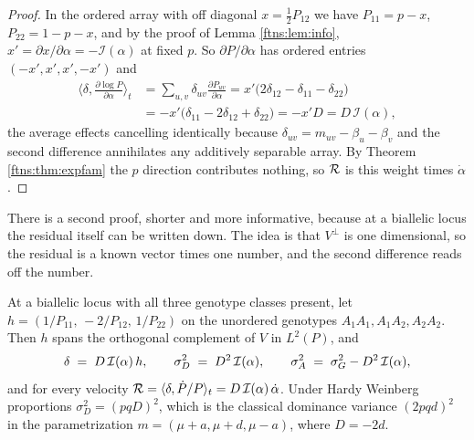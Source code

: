 \begin{proof}
In the ordered array with off diagonal $x=\tfrac12P_{12}$ we have $P_{11}=p-x$, $P_{22}=1-p-x$,
and by the proof of Lemma \ref{ftns:lem:info}, $x'=\partial x/\partial\alpha=-\mathcal{I}(\alpha)$
at fixed $p$. So $\partial P/\partial\alpha$ has ordered entries $(-x',x',x',-x')$ and
\begin{align*}
\Big\langle\delta,\frac{\partial \log P}{\partial\alpha}\Big\rangle_t
&=\sum_{u,v}\delta_{uv}\frac{\partial P_{uv}}{\partial\alpha}
= x'\big(2\delta_{12}-\delta_{11}-\delta_{22}\big)\\
&= -x'\big(\delta_{11}-2\delta_{12}+\delta_{22}\big) = -x'D = D\,\mathcal{I}(\alpha) ,
\end{align*}
the average effects cancelling identically because $\delta_{uv}=m_{uv}-\beta_u-\beta_v$ and the
second difference annihilates any additively separable array. By Theorem \ref{ftns:thm:expfam} the
$p$ direction contributes nothing, so $\mathcal{R}$ is this weight times $\dot\alpha$.
\end{proof}

There is a second proof, shorter and more informative, because at a biallelic locus the residual
itself can be written down. The idea is that $V^\perp$ is one dimensional, so the residual is a
known vector times one number, and the second difference reads off the number.

\begin{proposition}
\label{ftns:prop:resid}
At a biallelic locus with all three genotype classes present, let
$h=(1/P_{11},\,-2/P_{12},\,1/P_{22})$ on the unordered genotypes $A_1A_1,A_1A_2,A_2A_2$. Then $h$
spans the orthogonal complement of $V$ in $L^2(P)$, and
\begin{equation}
\delta \;=\; D\,\mathcal{I}(\alpha)\,h,
\qquad
\sigma^2_D \;=\; D^2\,\mathcal{I}(\alpha),
\qquad
\sigma^{2}_{A} \;=\; \sigma^2_G-D^2\,\mathcal{I}(\alpha),
\label{ftns:eq:resid}
\end{equation}
and for every velocity $\mathcal{R}=\langle\delta,\dot P/P\rangle_t=D\,\mathcal{I}(\alpha)\,\dot\alpha$. Under
Hardy Weinberg proportions $\sigma^2_D=(pqD)^2$, which is the classical dominance variance
$(2pqd)^2$ in the parametrization $m=(\mu+a,\mu+d,\mu-a)$, where $D=-2d$.
\end{proposition}

